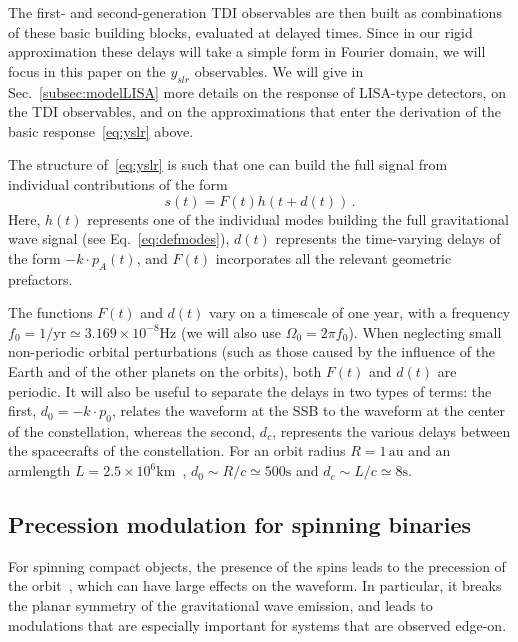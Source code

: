 \documentclass[aps,showpacs,twocolumn,
prd,superscriptaddress,nofootinbib]{revtex4-1}
\newcommand{\be}{\begin{equation}}
\newcommand{\ee}{\end{equation}}
\newcommand{\hatk}{k}
\begin{document}
The first- and second-generation TDI observables are then built as combinations of these basic building blocks, evaluated at delayed times. Since in our rigid approximation these delays will take a simple form in Fourier domain, we will focus in this paper on the $y_{slr}$ observables. We will give in Sec.~\ref{subsec:modelLISA} more details on the response of LISA-type detectors, on the TDI observables, and on the approximations that enter the derivation of the basic response~\eqref{eq:yslr} above.

The structure of~\eqref{eq:yslr} is such that one can build the full signal from individual contributions of the form
\be
	s(t) = F(t) h(t + d(t)) \,.
\ee
Here, $h(t)$ represents one of the individual modes building the full gravitational wave signal (see Eq.~\eqref{eq:defmodes}), $d(t)$ represents the time-varying delays of the form $-\hatk\cdot p_{A}(t)$, and $F(t)$ incorporates all the relevant geometric prefactors.

The functions $F(t)$ and $d(t)$ vary on a timescale of one year, with a frequency $f_{0} = 1/\mathrm{yr} \simeq 3.169\times10^{-8} \mathrm{Hz}$ (we will also use $\Omega_{0} = 2\pi f_{0}$). When neglecting small non-periodic orbital perturbations (such as those caused by the influence of the Earth and of the other planets on the orbits), both $F(t)$ and $d(t)$ are periodic. It will also be useful to separate the delays in two types of terms: the first, $d_{0} = -\hatk\cdot p_{0}$, relates the waveform at the SSB to the waveform at the center of the constellation, whereas the second, $d_{c}$, represents the various delays between the spacecrafts of the constellation. For an orbit radius $R=1\,\mathrm{au}$ and an armlength $L=2.5\times10^{6}\mathrm{km}$~\cite{LISA17}, $d_{0} \sim R/c \simeq 500\mathrm{s}$ and $d_{c} \sim L/c \simeq 8\mathrm{s}$.


\subsection{Precession modulation for spinning binaries}
\label{subsec:modulationPrec}

For spinning compact objects, the presence of the spins leads to the precession of the orbit~\cite{Apostolatos+94, Kidder95}, which can have large effects on the waveform. In particular, it breaks the planar symmetry of the gravitational wave emission, and leads to modulations that are especially important for systems that are observed edge-on.
\end{document}
